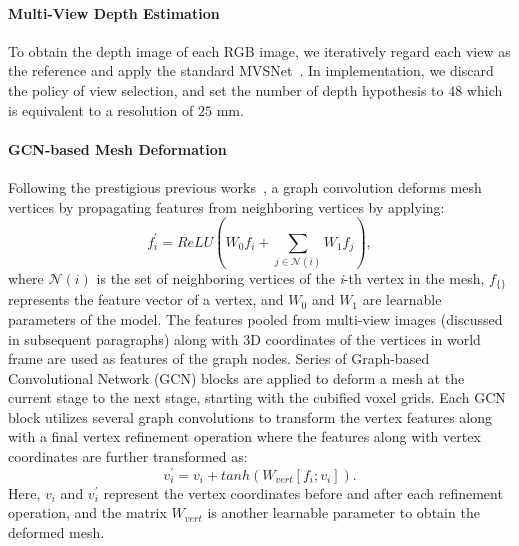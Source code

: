 \label{subsec:depth_prediction}
\paragraph{Multi-View Depth Estimation}\vspace{-4mm}
To obtain the depth image of each RGB image, we iteratively regard each view as the reference and apply the standard MVSNet~\cite{yao2018mvsnet}.
In implementation, we discard the policy of view selection, and set the number of depth hypothesis to $48$ which is equivalent to a resolution of $25$ mm.





\paragraph{GCN-based Mesh Deformation}\vspace{-4mm}
Following the prestigious previous works~\cite{wang2018pixel2mesh,wen2019pixel2mesh++}, a graph convolution deforms mesh vertices by propagating features from neighboring vertices by applying:
\begin{equation}
f_{i}^{'} = ReLU(W_0f_i + \sum_{j \in \mathcal{N}(i)} W_1 f_j),
\end{equation}
where $\mathcal{N}(i)$ is the set of neighboring vertices of the \emph{i}-th vertex in the mesh, $f_{\{\}}$ represents the feature vector of a vertex, and $W_0$ and $W_1$ are learnable parameters of the model.
The features pooled from multi-view images (discussed in subsequent paragraphs) along with 3D coordinates of the vertices in world frame are used as features of the graph nodes.
Series of Graph-based Convolutional Network (GCN) blocks are applied to deform a mesh at the current stage to the next stage, starting with the cubified voxel grids.
Each GCN block utilizes several graph convolutions to transform the vertex features along with a final vertex refinement operation where the features along with vertex coordinates are further transformed as:
\begin{equation}
v_i^{'} = v_i + tanh(W_{vert}[f_i;v_i]).
\end{equation}
Here, $v_i$ and $v_i^{'}$ represent the vertex coordinates before and after each refinement operation, and the matrix $W_{vert}$ is another learnable parameter to obtain the deformed mesh.

